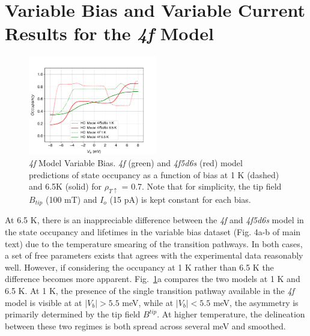 \documentclass[reprint,amsmath,amssymb,aps,nofootinbib,onecolumn]{revtex4-2}
\begin{document}
\section{Variable Bias and Variable Current Results for the \textit{4f} Model}
\begin{figure}[h!]
\includegraphics[width=0.5\textwidth]{model_4f.pdf}
\caption{\textit{4f} Model Variable Bias. \textit{4f} (green) and \textit{4f5d6s} (red) model predictions of state occupancy as a function of bias at 1 K (dashed) and 6.5K (solid) for $\rho_{T \uparrow}$ = 0.7. Note that for simplicity, the tip field $B_{tip}$ (100 mT) and $I_o$ (15 pA) is kept constant for each bias. 
\label{fig:bias_curr} }
\end{figure}

At 6.5 K, there is an inappreciable difference between the \textit{4f} and \textit{4f5d6s} model in the state occupancy and lifetimes in the variable bias dataset (Fig. 4a-b of main text) due to the temperature smearing of the transition pathways. In both cases, a set of free parameters exists that agrees with the experimental data reasonably well. However, if considering the occupancy at 1 K rather than 6.5 K the difference becomes more apparent. Fig.~\ref{fig:bias_curr}a compares the two models at 1 K and 6.5 K. At 1 K, the presence of the single transition pathway available in the \textit{4f} model is visible at at $|V_b|>5.5$ meV, while at $|V_b|<5.5$ meV, the asymmetry is primarily determined by the tip field $B^{tip}$. At higher temperature, the delineation between these two regimes is both spread across several meV and smoothed.   




\end{document}
